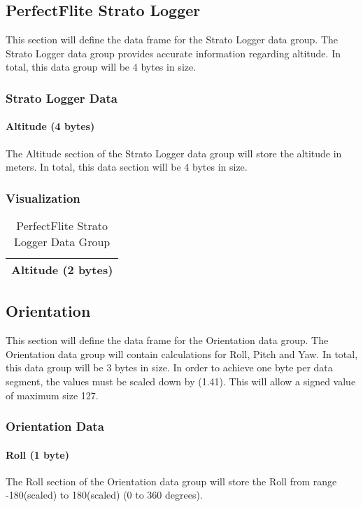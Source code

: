 \documentclass{article}
\begin{document}
 \pagebreak
 
  \subsection{PerfectFlite Strato Logger}
  This section will define the data frame for the Strato Logger data group. The Strato Logger data group provides accurate information regarding altitude. In total, this data group will be 4 bytes in size.
  \subsubsection{Strato Logger Data}
  \paragraph{Altitude (4 bytes)}
  The Altitude section of the Strato Logger data group will store the altitude in meters. In total, this data section will be 4 bytes in size.
  
  \subsubsection{Visualization}
  \begin{table}[H]
  \centering
  \caption{PerfectFlite Strato Logger Data Group}
  \label{my-label}
  \begin{tabular}{|l|}
  \hline
Altitude (2 bytes) \\ \hline
 \end{tabular}
 \end{table}
  
 \pagebreak
  
  \subsection{Orientation}
  This section will define the data frame for the Orientation data group. The Orientation data group will contain calculations for Roll, Pitch and Yaw. In total, this data group will be 3 bytes in size. In order to achieve one byte per data segment, the values must be scaled down by (1.41). This will allow a signed value of maximum size 127.
  \subsubsection{Orientation Data}
  \paragraph{Roll (1 byte)}
  The Roll section of the Orientation data group will store the Roll from range -180(scaled) to 180(scaled) (0 to 360 degrees).
\end{document}
